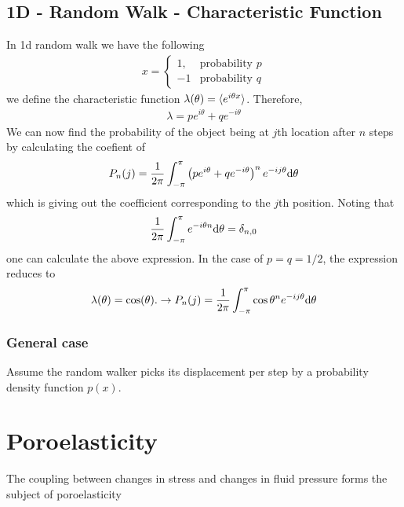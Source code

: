 \subsection{1D - Random Walk - Characteristic Function}
%
In 1d random walk we have the following
%
\begin{align}
  x =
  \begin{cases}
    1, & \text{probability  } p \\
    -1 & \text{probability  } q
  \end{cases}
\end{align}
%
we define the characteristic function $\lambda(\theta) = \langle e^{i \theta x} \rangle
$.  Therefore, 
% 
\begin{align}
  \lambda = p e^{i\theta} + q e^{-i\theta}
\end{align}
%
We can now find the probability of the object being at $j$th location
after $n$ steps by calculating the coefient of
%
\begin{align}
  P_n(j) = \frac{1}{2\pi} \int_{-\pi}^{\pi} \left( p e^{i\theta} + q e^{-i\theta} \right)^n e^{-ij\theta}\text{d} \theta
\end{align}
%
which is giving out the coefficient corresponding to the $j$th
position. Noting that
%
\begin{align}
  \frac{1}{2\pi} \int_{-\pi}^{\pi} e^{-i\theta n}\text{d} \theta = \delta_{n,0}
\end{align}
%
one can calculate the above expression. In the case of $p=q = 1/2$,
the expression reduces to
%
\begin{align}
  \lambda (\theta) = \cos(\theta). \to P_n(j) = \frac{1}{2\pi} \int_{-\pi}^{\pi} \cos\theta^n e^{-ij \theta}\text{d} \theta
\end{align}

\subsubsection{General case}

Assume the random walker picks its displacement per step by a
probability density function $p(x)$. 





\newpage

\section{Poroelasticity}

The coupling between changes in stress and changes in fluid pressure
forms the subject of poroelasticity


